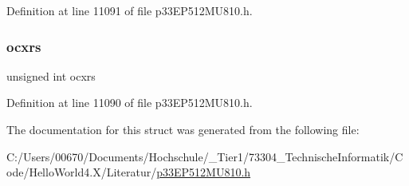 Definition at line 11091 of file p33\+E\+P512\+M\+U810.\+h.

\mbox{\label{structtag_o_c_ae0b9ec26b0c1cf6a041e02a5267bb9b3}} 
\subsubsection{\texorpdfstring{ocxrs}{ocxrs}}
{\footnotesize\ttfamily unsigned int ocxrs}



Definition at line 11090 of file p33\+E\+P512\+M\+U810.\+h.



The documentation for this struct was generated from the following file\+:\begin{DoxyCompactItemize}
\item 
C\+:/\+Users/00670/\+Documents/\+Hochschule/\+\_\+\+Tier1/73304\+\_\+\+Technische\+Informatik/\+Code/\+Hello\+World4.\+X/\+Literatur/\hyperlink{p33_e_p512_m_u810_8h}{p33\+E\+P512\+M\+U810.\+h}\end{DoxyCompactItemize}
